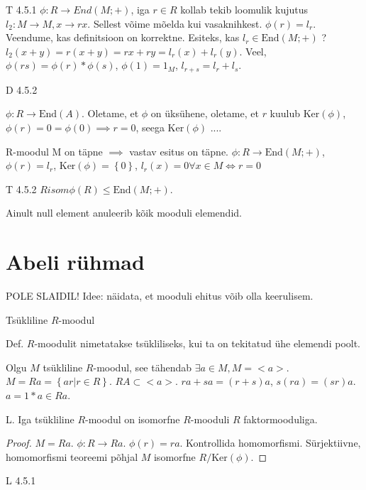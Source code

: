 \documentclass[12pt]{report}
\numberwithin{equation}{section}
\theoremstyle{definition}
\theoremstyle{plain}
\begin{document}
T 4.5.1
$\phi : R \to End(M;+)$, iga $r \in R$ kollab tekib loomulik kujutus $l_2: M \to M, x \to rx$. Sellest võime mõelda kui vasaknihkest.  $\phi \left( r \right ) = l_r$. Veendume, kas definitsioon on korrektne. Esiteks, kas $l_r \in \text{End}(M;+)$ ? $l_2 (x +y ) = r (x + y ) = rx + ry = l_r(x) + l_r(y)$. Veel, $\phi(rs) = \phi(r) * \phi(s)$, $\phi(1) = 1_M$, $l_{r+s} = l_r + l_s$.

D 4.5.2

$\phi: R \to \text{End}(A)$. Oletame, et $\phi$ on \"uks\"uhene, oletame, et $r$ kuulub Ker$(\phi)$, $\phi(r) = 0 = \phi(0) \implies r=0$, seega Ker$(\phi)$  ....

R-moodul M on täpne $\implies$ vastav esitus on täpne. $\phi : R \to \text{End}(M;+)$, $\phi(r) = l_r$, Ker$(\phi) = \left\{ 0 \right\}$, $l_r(x) = 0 \forall x \in M \iff r=0$

T 4.5.2
$R isom \phi(R) \leq \text{End} \left( M;+ \right)$.

Ainult null element anuleerib kõik mooduli elemendid. 

\section{Abeli r\"uhmad}
POLE SLAIDIL! 
Idee: näidata, et mooduli ehitus võib olla keerulisem. 

Tsükliline $R$-moodul 

Def. $R$-moodulit nimetatakse ts\"ukliliseks, kui ta on tekitatud \"uhe elemendi poolt. 

Olgu $M$ ts\"ukliline $R$-moodul, see tähendab $\exists a \in M, M = < a >$. $M = Ra = \left\{ ar | r \in R \right\}$. $RA \subset < a > $. $ra + sa = (r + s) a$, $s(ra) = (sr)a$. $a = 1 * a \in Ra$. 

L. Iga ts\"ukliline $R$-moodul on isomorfne $R$-mooduli $R$ faktormooduliga. 

\begin{proof}
$M = Ra$.
$\phi: R \to Ra$.
$\phi(r) = ra$.
Kontrollida homomorfismi. S\"urjektiivne, homomorfismi teoreemi põhjal $M$ isomorfne $R/ \text{Ker} \left( \phi \right)$.

\end{proof}



L 4.5.1
\end{document}

